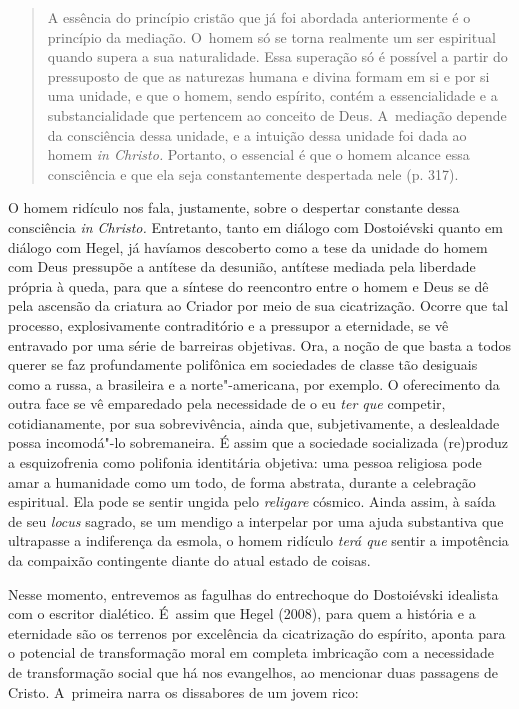 \begin{quote}
A essência do princípio cristão que já foi abordada anteriormente é o
princípio da mediação. O~homem só se torna realmente um ser espiritual
quando supera a sua naturalidade. Essa superação só é possível a partir
do pressuposto de que as naturezas humana e divina formam em si e por si
uma unidade, e que o homem, sendo espírito, contém a essencialidade e a
substancialidade que pertencem ao conceito de Deus. A~mediação depende
da consciência dessa unidade, e a intuição dessa unidade foi dada ao
homem \emph{in Christo.} Portanto, o essencial é que o homem alcance
essa consciência e que ela seja constantemente despertada nele (p. 317).
\end{quote}

O homem ridículo nos fala, justamente, sobre o despertar constante dessa
consciência \emph{in Christo.} Entretanto, tanto em diálogo com
Dostoiévski quanto em diálogo com Hegel, já havíamos descoberto como a
tese da unidade do homem com Deus pressupõe a antítese da desunião,
antítese mediada pela liberdade própria à queda, para que a síntese do
reencontro entre o homem e Deus se dê pela ascensão da criatura ao
Criador por meio de sua cicatrização. Ocorre que tal processo,
explosivamente contraditório e a pressupor a eternidade, se vê entravado
por uma série de barreiras objetivas. Ora, a noção de que basta a todos
querer se faz profundamente polifônica em sociedades de classe tão
desiguais como a russa, a brasileira e a norte"-americana, por exemplo. O
oferecimento da outra face se vê emparedado pela necessidade de o eu
\emph{ter que} competir, cotidianamente, por sua sobrevivência, ainda
que, subjetivamente, a deslealdade possa incomodá"-lo sobremaneira. É
assim que a sociedade socializada (re)produz a esquizofrenia como
polifonia identitária objetiva: uma pessoa religiosa pode amar a
humanidade como um todo, de forma abstrata, durante a celebração
espiritual. Ela pode se sentir ungida pelo \emph{religare} cósmico.
Ainda assim, à saída de seu \emph{locus} sagrado, se um mendigo a
interpelar por uma ajuda substantiva que ultrapasse a indiferença da
esmola, o homem ridículo \emph{terá que} sentir a impotência da
compaixão contingente diante do atual estado de coisas.

Nesse momento, entrevemos as fagulhas do entrechoque do Dostoiévski
idealista com o escritor dialético. É~assim que Hegel (2008), para quem
a história e a eternidade são os terrenos por excelência da cicatrização
do espírito, aponta para o potencial de transformação moral em completa
imbricação com a necessidade de transformação social que há nos
evangelhos, ao mencionar duas passagens de Cristo. A~primeira narra os
dissabores de um jovem rico:

